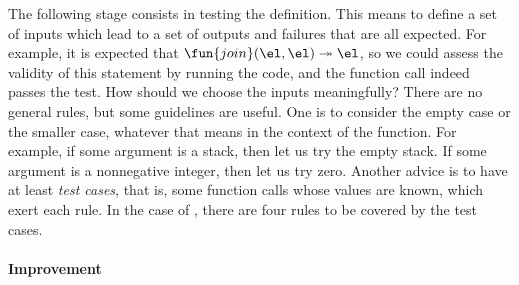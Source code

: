 The following stage consists in testing the definition. This means to
define a set of inputs which lead to a set of outputs and failures
that are all expected. For example, it is expected that
\(\fun{join}(\el,\el) \twoheadrightarrow \el\), so we could assess
the validity of this statement by running the code, and the function
call indeed passes the test. How should we choose the inputs
meaningfully? There are no general rules, but some guidelines are
useful. One is to consider the empty case or the smaller case,
whatever that means in the context of the function. For example, if
some argument is a stack, then let us try the empty stack. If some
argument is a nonnegative integer, then let us try zero. Another
advice is to have at least \emph{test cases}, that is, some function
calls whose values are known, which exert each rule. In the case of
, there are four rules to be covered by the test cases.

\paragraph{Improvement}

